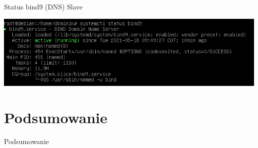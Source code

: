 \documentclass[presentation]{beamer}
\begin{document}
\begin{frame}[label={sec:orga729c4c}]{Status bind9 (DNS) Slave}
\begin{center}
\includegraphics[width=.9\linewidth]{./data/dns/6.png}
\end{center}
\end{frame}
\section{Podsumowanie}
\label{sec:org3bc7190}
\begin{frame}[label={sec:org713f1b3}]{Podsumowanie}
\end{frame}
\end{document}
